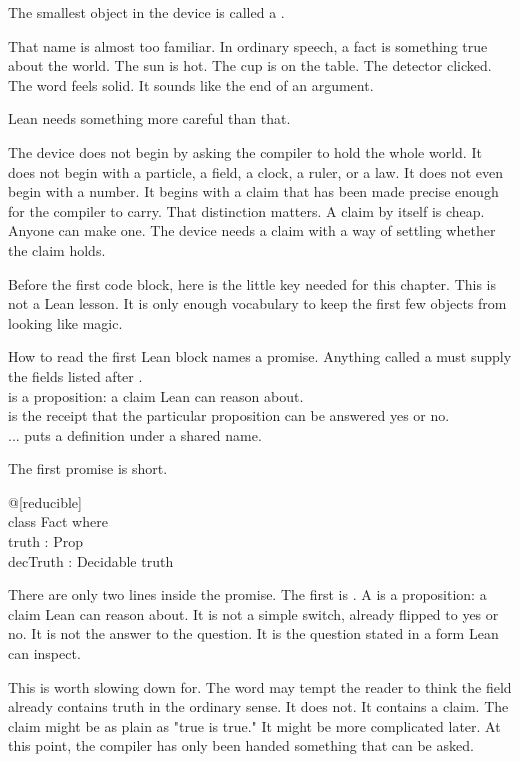 The smallest object in the device is called a .

That name is almost too familiar. In ordinary speech, a fact is something true
about the world. The sun is hot. The cup is on the table. The detector clicked.
The word feels solid. It sounds like the end of an argument.

Lean needs something more careful than that.

The device does not begin by asking the compiler to hold the whole world. It
does not begin with a particle, a field, a clock, a ruler, or a law. It does
not even begin with a number. It begins with a claim that has been made precise
enough for the compiler to carry. That distinction matters. A claim by itself is
cheap. Anyone can make one. The device needs a claim with a way of settling
whether the claim holds.

Before the first code block, here is the little key needed for this chapter.
This is not a Lean lesson. It is only enough vocabulary to keep the first few
objects from looking like magic.

\begin{sidebar}{How to read the first Lean block}
\label{sb:how-to-read-lean}
 names a promise. Anything called a  must supply the
fields listed after .\\
 is a proposition: a claim Lean can reason about.\\
 is the receipt that the particular proposition  can
be answered yes or no.\\
 ...  puts a definition under a shared name.
\end{sidebar}

The first promise is short.

\begin{leancode}
@[reducible]\\
class Fact where\\
\quad truth : Prop\\
\quad decTruth : Decidable truth
\end{leancode}

There are only two lines inside the promise. The first is
. A  is a proposition: a claim Lean can reason
about. It is not a simple switch, already flipped to yes or no. It is not the
answer to the question. It is the question stated in a form Lean can inspect.

This is worth slowing down for. The word  may tempt the reader to
think the field already contains truth in the ordinary sense. It does not. It
contains a claim. The claim might be as plain as "true is true." It might be
more complicated later. At this point, the compiler has only been handed
something that can be asked.

